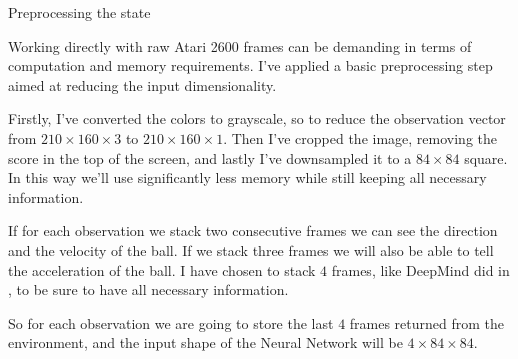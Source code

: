 \documentclass[10pt, aspectratio=169, compress, protectframetitle, handout]{beamer}
\begin{document}
\begin{frame}{Preprocessing the state}

    Working directly with raw Atari 2600 frames can be \alert{demanding} in terms of computation and memory requirements. I've applied a basic preprocessing step aimed at reducing the input dimensionality.
    
    Firstly, I've converted the colors to \alert{grayscale}, so to reduce the observation vector from $210 \times 160 \times 3$ to $210 \times 160 \times 1$. Then I've \alert{cropped} the image, removing the score in the top of the screen, and lastly I've \alert{downsampled} it to a $84 \times 84$ square. In this way we'll use significantly less memory while still keeping all necessary information.

    If for each observation we stack two consecutive frames we can see the direction and the velocity of the ball. If we stack three frames we will also be able to tell the acceleration of the ball. I have chosen to \alert{stack $4$ frames}, like DeepMind did in \cite{Mnih2015}, to be sure to have all necessary information. 
    
    So for each observation we are going to store the last $4$ frames returned from the environment, and the input shape of the Neural Network will be $ 4 \times 84 \times 84$.

    
\end{frame}
\end{document}
